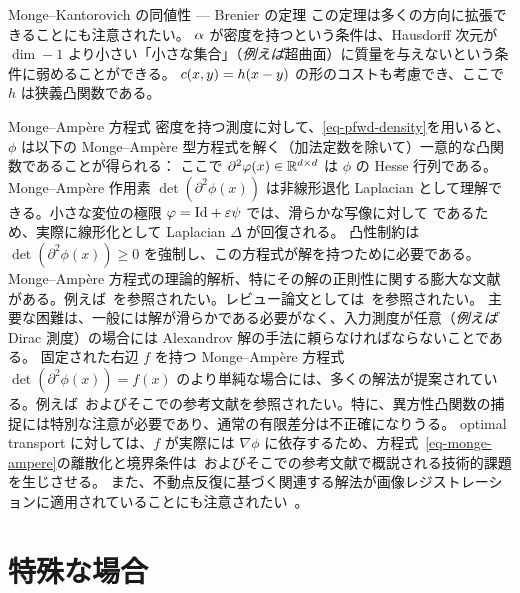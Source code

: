 \begin{rem2}{Monge--Kantorovich の同値性 --- Brenier の定理}
この定理は多くの方向に拡張できることにも注意されたい。
%
$\alpha$ が密度を持つという条件は、Hausdorff 次元が $\dim-1$ より小さい「小さな集合」（\emph{例えば}超曲面）に質量を与えないという条件に弱めることができる。
%
$c(x,y)=h(x-y)$ の形のコストも考慮でき、ここで $h$ は狭義凸関数である。
\end{rem2}


\begin{rem2}{Monge--Amp\`ere 方程式}\label{rem:MA}
密度を持つ測度に対して、\eqref{eq-pfwd-density}を用いると、$\phi$ は以下の Monge--Amp\`ere 型方程式を解く（加法定数を除いて）一意的な凸関数であることが得られる：
ここで $\partial^2\varphi(x) \in \mathbb{R}^{d \times d}$ は $\phi$ の Hesse 行列である。Monge--Amp\`ere 作用素 $\det(\partial^2\phi(x))$ は非線形退化 Laplacian として理解できる。小さな変位の極限 $\varphi=\mathrm{Id} + \varepsilon\psi$ では、滑らかな写像に対して
であるため、実際に線形化として Laplacian $\Delta$ が回復される。
%
凸性制約は $\det(\partial^2\phi(x)) \geq 0$ を強制し、この方程式が解を持つために必要である。
%
Monge--Amp\`ere 方程式の理論的解析、特にその解の正則性に関する膨大な文献がある。例えば~\citep{gutierrez2016monge}を参照されたい。レビュー論文としては~\citet{caffarelli2003monge}を参照されたい。
%
主要な困難は、一般には解が滑らかである必要がなく、入力測度が任意（\emph{例えば} Dirac 測度）の場合には Alexandrov 解の手法に頼らなければならないことである。
%
固定された右辺 $f$ を持つ Monge--Amp\`ere 方程式 $\det(\partial^2 \phi(x)) = f(x)$ のより単純な場合には、多くの解法が提案されている。例えば~\citep{benamou2016monotone}およびそこでの参考文献を参照されたい。特に、異方性凸関数の捕捉には特別な注意が必要であり、通常の有限差分は不正確になりうる。
%
optimal transport に対しては、$f$ が実際には $\nabla \phi$ に依存するため、方程式~\eqref{eq-monge-ampere}の離散化と境界条件は~\citep{benamou2014numerical}およびそこでの参考文献で概説される技術的課題を生じさせる。
%
また、不動点反復に基づく関連する解法が画像レジストレーションに適用されていることにも注意されたい~\citep{haker2004optimal}。
\end{rem2}


\section{特殊な場合}\label{sec:specialcases}

